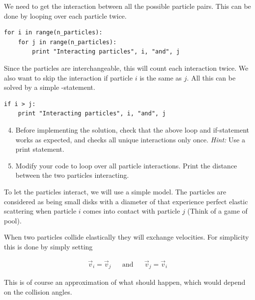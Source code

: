 \documentclass{article}
\begin{document}
We need to get the interaction between all the possible particle pairs.
This can be done by looping over each particle twice.


\begin{lstlisting}
for i in range(n_particles):
    for j in range(n_particles):
        print "Interacting particles", i, "and", j
\end{lstlisting}

Since the particles are interchangeable, this will count each interaction twice.
We also want to skip the interaction if particle $i$ is the same as $j$.
All this can be solved by a simple -statement.

\begin{lstlisting}
if i > j:
    print "Interacting particles", i, "and", j

\end{lstlisting}

\begin{enumerate}
  \setcounter{enumi}{3}
  \item Before implementing the solution, check that the above loop and
      if-statement works as expected, and checks all unique interactions only once. 
      {\em Hint:} Use a print statement.

  \item Modify your code to loop over all particle interactions.
      Print the distance between the two particles interacting.

\end{enumerate}

To let the particles interact, we will use a simple model.
The particles are considered as being small disks with a diameter of  that experience perfect elastic scattering when particle $i$ comes into contact with particle $j$
(Think of a game of pool).

When two particles collide elastically they will exchange velocities.
For simplicity this is done by simply setting

\begin{align}
  \vec{v}_i = \vec{v}_j & & \text{and} & & \vec{v}_j = \vec{v}_i
\end{align}

This is of course an approximation of what should happen, which would depend on the collision angles.
\end{document}
